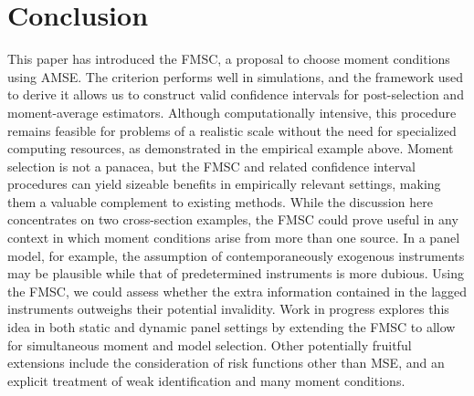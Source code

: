 \section{Conclusion}
\label{sec:conclude}
This paper has introduced the FMSC, a proposal to choose moment conditions using AMSE. 
The criterion performs well in simulations, and the framework used to derive it allows us to construct valid confidence intervals for post-selection and moment-average estimators.  
Although computationally intensive, this procedure remains feasible for problems of a realistic scale without the need for specialized computing resources, as demonstrated in the empirical example above.
Moment selection is not a panacea, but the FMSC and related confidence interval procedures can yield sizeable benefits in empirically relevant settings, making them a valuable complement to existing methods.
While the discussion here concentrates on two cross-section examples, the FMSC could prove useful in any context in which moment conditions arise from more than one source. 
In a panel model, for example, the assumption of contemporaneously exogenous instruments may be plausible while that of predetermined instruments is more dubious.
Using the FMSC, we could assess whether the extra information contained in the lagged instruments outweighs their potential invalidity. 
Work in progress explores this idea in both static and dynamic panel settings by extending the FMSC to allow for simultaneous moment and model selection.
Other potentially fruitful extensions include the consideration of risk functions other than MSE, and an explicit treatment of weak identification and many moment conditions.
